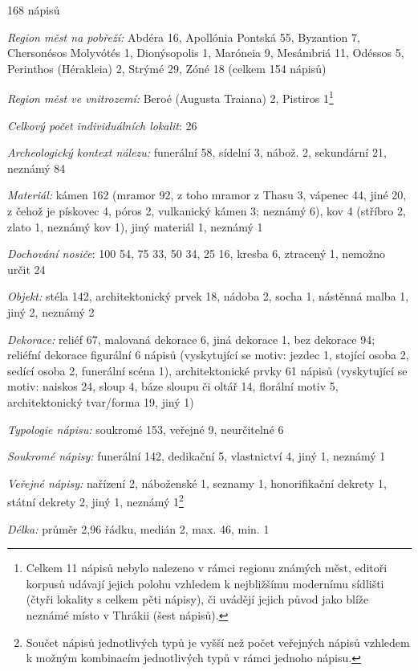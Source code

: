 \placetable[none]{}
\starttable[|l|]
\HL
{} 168 nápisů

{\em Region měst na pobřeží:} Abdéra 16, Apollónia Pontská 55, Byzantion 7, Chersonésos Molyvótés 1, Dionýsopolis 1, Maróneia 9, Mesámbriá 11, Odéssos 5, Perinthos (Hérakleia) 2, Strýmé 29, Zóné 18 (celkem 154 nápisů)

{\em Region měst ve vnitrozemí:} Beroé (Augusta Traiana) 2, Pistiros 1\footnote{Celkem 11 nápisů nebylo nalezeno v rámci regionu známých měst, editoři korpusů udávají jejich polohu vzhledem k nejbližšímu modernímu sídlišti (čtyři lokality s celkem pěti nápisy), či uvádějí jejich původ jako blíže neznámé místo v Thrákii (šest nápisů).}

{\em Celkový počet individuálních lokalit}: 26

{\em Archeologický kontext nálezu:} funerální 58, sídelní 3, nábož. 2, sekundární 21, neznámý 84

{\em Materiál:} kámen 162 (mramor 92, z toho mramor z Thasu 3, vápenec 44, jiné 20, z čehož je pískovec 4, póros 2, vulkanický kámen 3; neznámý 6), kov 4 (stříbro 2, zlato 1, neznámý kov 1), jiný materiál 1, neznámý 1

{\em Dochování nosiče}: 100  54, 75  33, 50  34, 25  16, kresba 6, ztracený 1, nemožno určit 24

{\em Objekt:} stéla 142, architektonický prvek 18, nádoba 2, socha 1, nástěnná malba 1, jiný 2, neznámý 2

{\em Dekorace:} reliéf 67, malovaná dekorace 6, jiná dekorace 1, bez dekorace 94; reliéfní dekorace figurální 6 nápisů (vyskytující se motiv: jezdec 1, stojící osoba 2, sedící osoba 2, funerální scéna 1), architektonické prvky 61 nápisů (vyskytující se motiv: naiskos 24, sloup 4, báze sloupu či oltář 14, florální motiv 5, architektonický tvar/forma 19, jiný 1)

{\em Typologie nápisu:} soukromé 153, veřejné 9, neurčitelné 6

{\em Soukromé nápisy:} funerální 142, dedikační 5, vlastnictví 4, jiný 1, neznámý 1

{\em Veřejné nápisy:} nařízení 2, náboženské 1, seznamy 1, honorifikační dekrety 1, státní dekrety 2, jiný 1, neznámý 1\footnote{Součet nápisů jednotlivých typů je vyšší než počet veřejných nápisů vzhledem k možným kombinacím jednotlivých typů v rámci jednoho nápisu.}

{\em Délka:} průměr 2,96 řádku, medián 2, max. 46, min. 1

